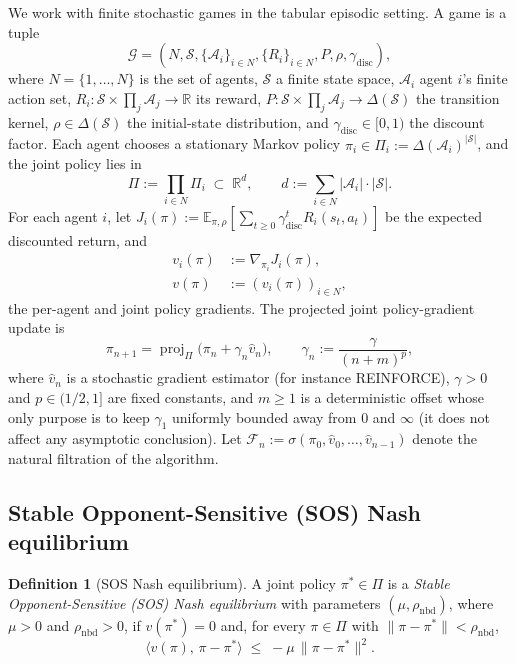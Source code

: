 \documentclass{article}
\theoremstyle{plain}
\theoremstyle{definition}
\newtheorem{definition}[theorem]{Definition}
\theoremstyle{remark}
\newcommand{\E}{\mathbb{E}}
\newcommand{\proj}{\operatorname{proj}}
\begin{document}
We work with finite stochastic games in the tabular episodic setting. A game is a tuple
\begin{equation}\label{eq:game}
\mathcal{G} = (N,\mathcal{S},\{\mathcal{A}_i\}_{i\in N},\{R_i\}_{i\in N},P,\rho,\gamma_{\mathrm{disc}}),
\end{equation}
where $N=\{1,\ldots,N\}$ is the set of agents, $\mathcal{S}$ a finite state space, $\mathcal{A}_i$ agent $i$'s finite action set, $R_i:\mathcal{S}\times\prod_j \mathcal{A}_j\to\mathbb{R}$ its reward, $P:\mathcal{S}\times\prod_j\mathcal{A}_j\to\Delta(\mathcal{S})$ the transition kernel, $\rho\in\Delta(\mathcal{S})$ the initial-state distribution, and $\gamma_{\mathrm{disc}}\in[0,1)$ the discount factor. Each agent chooses a stationary Markov policy $\pi_i\in\Pi_i := \Delta(\mathcal{A}_i)^{|\mathcal{S}|}$, and the joint policy lies in
\[
\Pi := \prod_{i\in N}\Pi_i \;\subset\; \mathbb{R}^d, \qquad d := \sum_{i\in N}|\mathcal{A}_i|\cdot|\mathcal{S}|.
\]
For each agent $i$, let $J_i(\pi) := \E_{\pi,\rho}\!\left[\sum_{t\ge 0}\gamma_{\mathrm{disc}}^t R_i(s_t,a_t)\right]$ be the expected discounted return, and
\begin{equation}\label{eq:grad}
\begin{aligned}
v_i(\pi) &:= \nabla_{\pi_i}J_i(\pi),\\
v(\pi) &:= (v_i(\pi))_{i\in N},
\end{aligned}
\end{equation}
the per-agent and joint policy gradients. The projected joint policy-gradient update is
\begin{equation}\label{eq:pg}
\pi_{n+1} = \proj_{\Pi}\!\bigl(\pi_n + \gamma_n \hat v_n\bigr), \qquad \gamma_n := \frac{\gamma}{(n+m)^p},
\end{equation}
where $\hat v_n$ is a stochastic gradient estimator (for instance REINFORCE), $\gamma>0$ and $p\in(1/2,1]$ are fixed constants, and $m\ge 1$ is a deterministic offset whose only purpose is to keep $\gamma_1$ uniformly bounded away from $0$ and $\infty$ (it does not affect any asymptotic conclusion). Let $\mathcal{F}_n := \sigma(\pi_0,\hat v_0,\ldots,\hat v_{n-1})$ denote the natural filtration of the algorithm.

\subsection{Stable Opponent-Sensitive (SOS) Nash equilibrium}

\begin{definition}[SOS Nash equilibrium]\label{def:sos}
A joint policy $\pi^\ast\in\Pi$ is a \emph{Stable Opponent-Sensitive (SOS) Nash equilibrium} with parameters $(\mu,\rho_{\mathrm{nbd}})$, where $\mu>0$ and $\rho_{\mathrm{nbd}}>0$, if $v(\pi^\ast)=0$ and, for every $\pi\in\Pi$ with $\|\pi-\pi^\ast\|<\rho_{\mathrm{nbd}}$,
\begin{equation}\label{eq:sos}
\langle v(\pi),\,\pi-\pi^\ast\rangle \;\le\; -\mu\,\|\pi-\pi^\ast\|^{2}.
\end{equation}
\end{definition}
\end{document}
